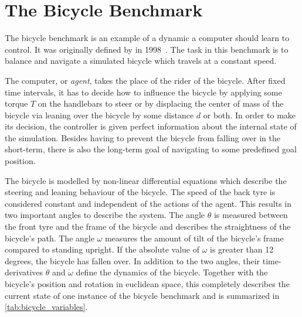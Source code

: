 \chapter{The Bicycle Benchmark}
\label{cha:the_bicycle_benchmark}
The bicycle benchmark is an example of a dynamic a computer should learn to control.
It was originally defined by \citeauthor{randlov_learning_1998} in 1998~\cite{randlov_learning_1998}.
The task in this benchmark is to balance and navigate a simulated bicycle which travels at a constant speed.

The computer, or \emph{agent}, takes the place of the rider of the bicycle.
After fixed time intervals, it has to decide how to influence the bicycle by applying some torque $T$ on the handlebars to steer or by displacing the center of mass of the bicycle via leaning over the bicycle by some distance $d$ or both.
In order to make its decision, the controller is given perfect information about the internal state of the simulation.
Besides having to prevent the bicycle from falling over in the short-term, there is also the long-term goal of navigating to some predefined goal position.

The bicycle is modelled by non-linear differential equations which describe the steering and leaning behaviour of the bicycle.
The speed of the back tyre is considered constant and independent of the actions of the agent.
This results in two important angles to describe the system.
The angle $\theta$ is measured between the front tyre and the frame of the bicycle and describes the straightness of the bicycle's path.
The angle $\omega$ measures the amount of tilt of the bicycle's frame compared to standing upright.
If the absolute value of $\omega$ is greater than 12 degrees, the bicycle has fallen over.
In addition to the two angles, their time-derivatives $\dot{\theta}$ and $\dot{\omega}$ define the dynamics of the bicycle.
Together with the bicycle's position and rotation in euclidean space, this completely describes the current state of one instance of the bicycle benchmark and is summarized in \cref{tab:bicycle_variables}.


